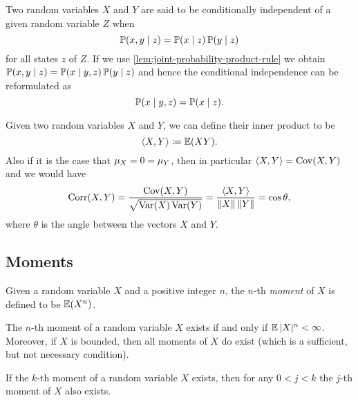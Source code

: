 \begin{definition}
    \label{def:conditional-independence}
    Two random variables \(X\) and \(Y\) are said to be conditionally independent of
    a given random variable \(Z\) when
    \[
        \operatorname{\mathbb{P}}(x, y \mid z) = \operatorname{\mathbb{P}}(x \mid z) \operatorname{\mathbb{P}}(y \mid z)
    \]
    for all states \(z\) of \(Z\). If we use
    \cref{lem:joint-probability-product-rule} we obtain \(\operatorname{\mathbb{P}}(x, y \mid z) =
    \operatorname{\mathbb{P}}(x \mid y, z) \operatorname{\mathbb{P}}(y \mid z)\) and hence the conditional independence can
    be reformulated as
    \[
        \operatorname{\mathbb{P}}(x \mid y, z) = \operatorname{\mathbb{P}}(x \mid z).
    \]
\end{definition}

\begin{definition}
    \label{def:inner-product-random-variables}
    Given two random variables \(X\) and \(Y\), we can define their inner product to
    be
    \[
        \langle X, Y \rangle \coloneq \operatorname{\mathbb{E}}(X Y).
    \]
    Also if it is the case that \(\mu_X = 0 = \mu_Y\), then in particular
    \(\langle X, Y \rangle = \operatorname{Cov}(X, Y)\) and we would have
    \[
        \operatorname{Corr}(X, Y) = \frac{\operatorname{Cov}(X, Y)}{\sqrt{\operatorname{Var}(X) \operatorname{Var}(Y)}}
        = \frac{\langle X, Y \rangle}{\| X \|\, \| Y \|} = \cos \theta,
    \]
    where \(\theta\) is the angle between the vectors \(X\) and \(Y\).
\end{definition}

\subsection{Moments}

\begin{definition}[Moment]
    \label{def:moment-random-variable}
    Given a random variable \(X\) and a positive integer \(n\), the \(n\)-th
    \emph{moment} of \(X\) is defined to be \(\operatorname{\mathbb{E}}(X^n)\).
\end{definition}

\begin{corollary}
    \label{cor:existence-of-rnd-variable-moment}
    The \(n\)-th moment of a random variable \(X\) exists if and only if
    \(\operatorname{\mathbb{E}} |X|^n < \infty\). Moreover, if \(X\) is bounded, then all moments of \(X\)
    do exist (which is a sufficient, but not necessary condition).
\end{corollary}

\begin{corollary}
    If the \(k\)-th moment of a random variable \(X\) exists, then for any \(0 < j <
    k\) the \(j\)-th moment of \(X\) also exists.
\end{corollary}

